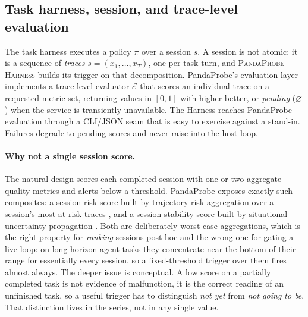 \documentclass[11pt,letterpaper]{article}
\newcommand{\evalfn}{\mathcal{E}}
\newcommand{\Harness}{\textsc{PandaProbe Harness}\xspace}
\begin{document}
\subsection{Task harness, session, and trace-level evaluation}
\label{sec:detect}

The task harness executes a policy $\pi$ over a session $s$. A session is not atomic: it is a
sequence of \emph{traces} $s=(x_1,\ldots,x_T)$, one per task turn, and \Harness builds its trigger
on that decomposition. PandaProbe's evaluation layer implements a trace-level evaluator $\evalfn$
that scores an individual trace on a requested metric set, returning values in $[0,1]$ with higher
better, or \emph{pending} ($\varnothing$) when the service is transiently unavailable. The Harness
reaches PandaProbe evaluation through a CLI/JSON seam that is easy to exercise against a stand-in.
Failures degrade to pending scores and never raise into the host loop.

\paragraph{Why not a single session score.}
The natural design scores each completed session with one or two aggregate quality metrics and
alerts below a threshold. PandaProbe exposes exactly such composites: a session risk score built by
trajectory-risk aggregation over a session's most at-risk traces \citep{tayebati2026tracer}, and a
session stability score built by situational uncertainty propagation \citep{zhao2024saup}. Both are
deliberately worst-case aggregations, which is the right property for \emph{ranking} sessions post
hoc and the wrong one for gating a live loop: on long-horizon agent tasks they concentrate near the
bottom of their range for essentially every session, so a fixed-threshold trigger over them fires
almost always. The deeper issue is conceptual. A low score on a partially completed task is not
evidence of malfunction, it is the correct reading of an unfinished task, so a useful trigger has to
distinguish \emph{not yet} from \emph{not going to be}. That distinction lives in the series, not in
any single value.
\end{document}
